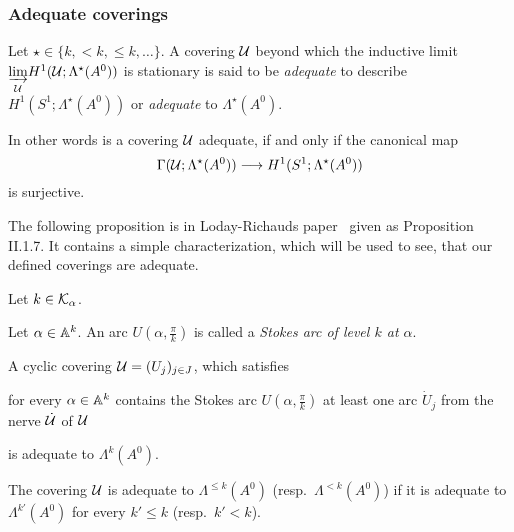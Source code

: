 \subsubsection{Adequate coverings}
\begin{defn}
  Let $\star\in\{k,<k,\leq k,\dots\}$.
  A covering $\mathcal{U}$ beyond which the inductive limit
  $\underset{\mathcal{U}}{\underrightarrow{\lim}}H^1(\mathcal{U};\Lambda^\star(A^0))$ is
  stationary is said to be \emph{adequate} to describe
  $H^1(S^1;\Lambda^\star(A^0))$ or \emph{adequate} to $\Lambda^\star(A^0)$.
  \begin{comment}
    A covering $\cU$ is said to be \emph{adequate} to describe
    $H^1(S^1;\Lambda^\star(A^0))$ or \emph{adequate} to $\Lambda^\star(A^0)$ if
    for every element in
    $\underset{\cU}{\underrightarrow{\lim}}H^1(\cU;\Lambda^\star(A^0))$
    given by some covering $\cU'$ and an element of
    $\Gamma(\cU';\Lambda^\star(A^0))$
    there exists
    \begin{itemize}
      \item an element in $\Gamma(\cU;\Lambda^\star(A^0))$ and
      \item an common refinement of $\cU$ and $\cU'$
    \end{itemize}
    such that \PROBLEM[the elements are~?? on the refined covering.]
  \end{comment}

  In other words is a covering $\mathcal{U}$ adequate, if and only if the canonical map
  \[
      \Gamma(\mathcal{U};\Lambda^\star(A^0))\longrightarrow H^1(S^1;\Lambda^\star(A^0))
  \]
  is surjective.
\end{defn}
The following proposition is in Loday-Richauds paper~\cite{Loday1994} given as
Proposition II.1.7. It contains a simple characterization, which will be used
to see, that our defined coverings are adequate.
\begin{prop}\label{prop:adeqCovCondition}
  Let $k\in\mathcal{K}_\alpha$.
  \begin{s-defn}
    Let $\alpha\in\mathbb{A}^k$.
    An arc $U(\alpha,\frac{\pi}{k})$ is called a \emph{Stokes arc of level $k$
    at $\alpha$}.
  \end{s-defn}
  A cyclic covering $\mathcal{U}=(U_j)_{j\in J}$, which satisfies
  \begin{einr}
    for every $\alpha\in\mathbb{A}^k$ contains the Stokes arc $U(\alpha,\frac{\pi}{k})$
    at least one arc $\dot U_j$ from the nerve $\dot{\mathcal{U}}$ of $\mathcal{U}$
  \end{einr}
  is adequate to $\Lambda^k(A^0)$.

  The covering $\mathcal{U}$ is adequate to $\Lambda^{\leq k}(A^0)$ (resp.\
  $\Lambda^{<k}(A^0)$) if it is adequate to $\Lambda^{k'}(A^0)$ for every
  $k'\leq k$ (resp.\ $k'<k$).
\end{prop}

